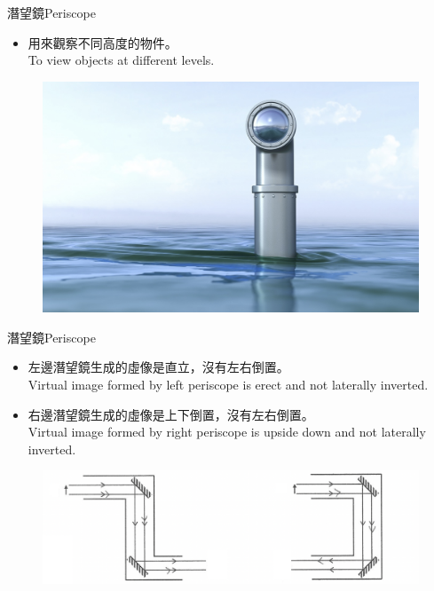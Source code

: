 \documentclass[beamer=true]{standalone}
\begin{document}
\begin{frame}{潛望鏡Periscope}
    \begin{itemize}
        \item 用來觀察不同高度的物件。\\To view objects at different levels.
    \end{itemize}\bigskip
    \begin{figure}
        \centering
        \includegraphics[width=0.5\linewidth]{assets/dqdjiwmage.png}
    \end{figure}
\end{frame}





\begin{frame}{潛望鏡Periscope}
    \begin{itemize}
        \item 左邊潛望鏡生成的虛像是直立，沒有左右倒置。\\Virtual image formed by left periscope is erect and not laterally inverted.
        \item 右邊潛望鏡生成的虛像是上下倒置，沒有左右倒置。\\Virtual image formed by right periscope is upside down and not laterally inverted.
    \end{itemize}
    \begin{figure}
        \centering
        \includegraphics[width=1\linewidth]{assets/dw109id099m0e.png}

    \end{figure}
\end{frame}

\end{document}
